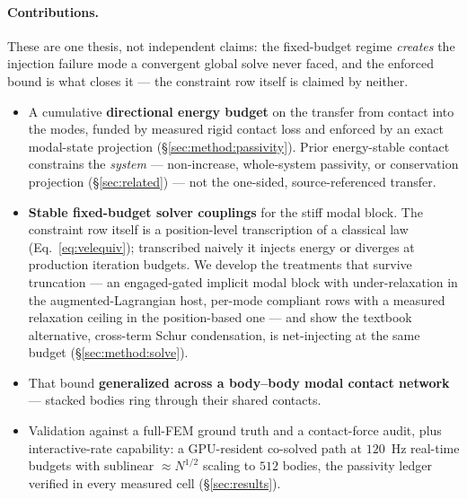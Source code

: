 \paragraph*{Contributions.} These are one thesis, not independent claims: the
fixed-budget regime \emph{creates} the injection failure mode a convergent
global solve never faced, and the enforced bound is what closes it --- the
constraint row itself is claimed by neither.
\begin{itemize}
  \item A cumulative \textbf{directional energy budget} on the transfer from
        contact into the modes, funded by measured rigid contact loss and
        enforced by an exact modal-state projection
        (\S\ref{sec:method:passivity}). Prior energy-stable contact constrains
        the \emph{system} --- non-increase, whole-system passivity, or
        conservation projection (\S\ref{sec:related}) --- not the one-sided,
        source-referenced transfer.
  \item \textbf{Stable fixed-budget solver couplings} for the stiff modal
        block. The constraint row itself is a position-level transcription
        of a classical law (Eq.~\ref{eq:velequiv}); transcribed naively it
        injects energy or diverges at production iteration budgets. We
        develop the treatments that survive truncation --- an engaged-gated
        implicit modal block with under-relaxation in the
        augmented-Lagrangian host, per-mode compliant rows with a measured
        relaxation ceiling in the position-based one --- and show the
        textbook alternative, cross-term Schur condensation, is
        net-injecting at the same budget (\S\ref{sec:method:solve}).
  \item That bound \textbf{generalized across a body--body modal contact
        network} --- stacked bodies ring through their shared contacts.
  \item Validation against a full-FEM ground truth and a contact-force audit,
        plus interactive-rate capability: a GPU-resident co-solved path at
        $120$~Hz real-time budgets with sublinear ${\approx}N^{1/2}$ scaling
        to $512$ bodies, the passivity ledger verified in every measured cell
        (\S\ref{sec:results}).
\end{itemize}
